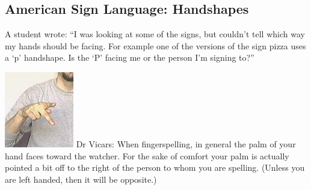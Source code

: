 \documentclass{article}
\begin{document}
\subsection{American Sign Language: Handshapes}

A student wrote:
``I was looking at some of the signs, but couldn't tell which way my hands should be facing.
For example one of the versions of the sign pizza uses a `p' handshape.
Is the `P' facing me or the person I'm signing to?''

\includegraphics[scale=0.5]{images-layout/handsh1.jpg}
Dr Vicars:
When fingerspelling, in general the palm of your hand faces toward the watcher.
For the sake of comfort your palm is actually pointed a bit off to the right of the person to whom you are spelling.
(Unless you are left handed, then it will be opposite.)
\end{document}
